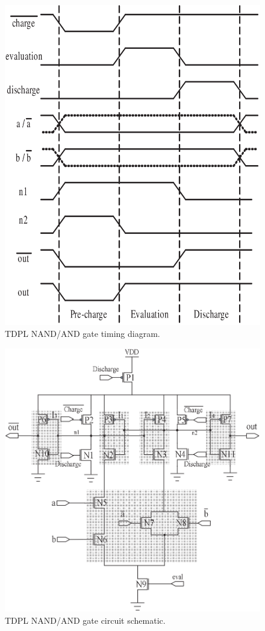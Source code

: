 \documentclass[conference, 12pt]{IEEEtran}
\newcommand{\x}{1}						%
\begin{document}
			\begin{figure}[tbp]
				\centering
				\includegraphics[width=\x\linewidth]{ReportFiles/TDPL_NAND_Timing.png}
				\caption{TDPL NAND/AND gate timing diagram.\cite{b1}}
				\label{TDPL_NAND_Timing}
			\end{figure}
			\begin{figure}[tbp]
				\centering
				\includegraphics[width=\x\linewidth]{ReportFiles/TDPL_NAND.png}
				\caption{TDPL NAND/AND gate circuit schematic.\cite{b1}}
				\label{TDPL_NAND}
			\end{figure}
\end{document}
